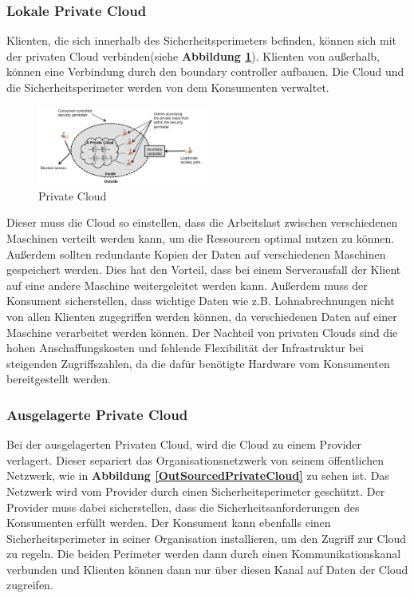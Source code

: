 \subsubsection{Lokale Private Cloud}
Klienten, die sich innerhalb des Sicherheitsperimeters befinden, können sich mit der privaten Cloud verbinden(siehe \textbf{Abbildung \ref{PrivateCloud}}). 
Klienten von außerhalb, können eine Verbindung durch den \glqq boundary controller\grqq{}{}{}{} aufbauen. Die Cloud und die Sicherheitsperimeter werden von dem Konsumenten verwaltet.
\begin{figure}[h]
    \centering
	\includegraphics[width=0.5\textwidth]{Images/On-sitePrivateCloud}
	\caption{Private Cloud \cite{Badger}}
	\label{PrivateCloud}
\end{figure}
Dieser muss die Cloud so einstellen, dass die Arbeitslast zwischen verschiedenen Maschinen verteilt werden kann, um die Ressourcen optimal nutzen zu können. Außerdem sollten redundante Kopien der Daten auf verschiedenen Maschinen 
gespeichert werden. Dies hat den Vorteil, dass bei einem Serverausfall der Klient auf eine andere Maschine weitergeleitet werden kann.
Außerdem muss der Konsument sicherstellen, dass wichtige Daten wie z.B. Lohnabrechnungen nicht von allen Klienten zugegriffen werden können,
da verschiedenen Daten auf einer Maschine verarbeitet werden können. Der Nachteil von privaten Clouds sind die hohen Anschaffungskosten und fehlende Flexibilität der Infrastruktur bei steigenden Zugriffszahlen, da die dafür benötigte Hardware vom Konsumenten bereitgestellt werden\cite{Badger}.

\subsubsection{Ausgelagerte Private Cloud}

Bei der ausgelagerten Privaten Cloud, wird die Cloud zu einem Provider verlagert. Dieser separiert das Organisationsnetzwerk
von seinem \glqq öffentlichen\grqq{}{}{}{} Netzwerk, wie in \textbf{Abbildung \ref{OutSourcedPrivateCloud}} zu sehen ist. Das Netzwerk wird vom Provider
durch einen Sicherheitsperimeter geschützt. Der Provider muss dabei sicherstellen, dass die Sicherheitsanforderungen des Konsumenten erfüllt werden. 
Der Konsument kann ebenfalls einen Sicherheitsperimeter in seiner Organisation installieren, um den Zugriff zur Cloud zu regeln.
Die beiden Perimeter werden dann durch einen Kommunikationskanal verbunden und Klienten können dann nur über diesen Kanal auf Daten der Cloud zugreifen.

